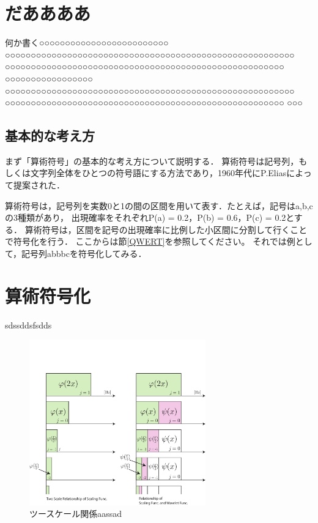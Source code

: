 \section{だああああ}
何か書く○○○○○○○○○○○○○○○○○○○○○○○○○ ○○○○○○○○○○○○○○○○○○○○○○○○○○○○○○○○○○○○○○○○○○○○○○○○○○○○○○○○ ○○○○○○○○○○○○○○○○○○○○○○○○○○○○○○○○○○○○○○○○○○○○○○○○○○○○○○ ○○○○○○○○○○○○○○○○○ ○○○○○○○○○○○○○○○○○○○○○○○○○○○○○○○○○○○○○○○○○○○○○○○○○○○○○○○○ ○○○○○○○○○○○○○○○○○○○○○○○○○○○○○○○○○○○○○○○○○○○○○○○○○○○○○○ ○○○


\subsection{基本的な考え方}
まず「算術符号」の{\gt 基本的な考え方について説明}する\cite{wavelet-2}．
算術符号は記号列，もしくは{\huge 文字列全体を\gt ひとつの符号語に}する方法であり，1960年代にP.Eliasによって提案された．\par
算術符号は，記号列を実数0と1の間の区間を用いて表す．たとえば，記号は{a,b,c}の3種類があり，
出現確率をそれぞれP(a) = 0.2，P(b) = 0.6，P(c) = 0.2とする．
算術符号は，区間を記号の出現確率に比例した小区間に分割して行くことで符号化を行う．
ここからは節\ref{QWERT}を参照してください。
それでは例として，記号列abbbcを符号化してみる．


\section{算術符号化}
sdssddsfsdds





\begin{figure}[htbp]
\begin{center}
\includegraphics[width=3in]{chap1/fig/two-scale.pdf}
\caption{ツースケール関係aassad} \label{fig-two-scale.pdf}
\end{center}
\end{figure}

